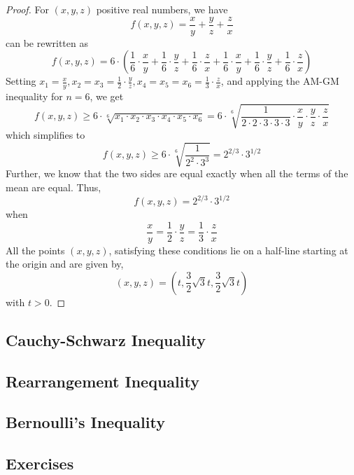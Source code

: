 \documentclass[
	12pt, %
	fleqn, %
	a4paper, %
]{LegrandOrangeBook}
\begin{document}
    \begin{proof}
    For \( (x, y, z) \) positive real numbers, we have
    \[
    f(x, y, z) = \frac{x}{y} + \frac{y}{z} + \frac{z}{x}
    \]
    can be rewritten as
    \[
    f(x, y, z) = 6 \cdot \left( \frac{1}{6} \cdot \frac{x}{y} + \frac{1}{6} \cdot \frac{y}{z} + \frac{1}{6} \cdot \frac{z}{x} + \frac{1}{6} \cdot \frac{x}{y} + \frac{1}{6} \cdot \frac{y}{z} + \frac{1}{6} \cdot \frac{z}{x} \right)
    \]
    Setting \( x_1 = \frac{x}{y}, x_2 = x_3 = \frac{1}{2} \cdot \frac{y}{z}, x_4 = x_5 = x_6 = \frac{1}{3} \cdot \frac{z}{x} \), and applying the AM-GM inequality for \( n = 6 \), we get
    \[
    f(x, y, z) \geq 6 \cdot \sqrt[6]{x_1 \cdot x_2 \cdot x_3 \cdot x_4 \cdot x_5 \cdot x_6} = 6 \cdot \sqrt[6]{\frac{1}{2 \cdot 2 \cdot 3 \cdot 3 \cdot 3} \cdot \frac{x}{y} \cdot \frac{y}{z} \cdot \frac{z}{x}}
    \]
    which simplifies to
    \[
    f(x, y, z) \geq 6 \cdot \sqrt[6]{\frac{1}{2^2 \cdot 3^3}} = 2^{2/3} \cdot 3^{1/2}
    \]
    Further, we know that the two sides are equal exactly when all the terms of the mean are equal. Thus,
    \[
    f(x, y, z) = 2^{2/3} \cdot 3^{1/2}
    \]
    when
    \[
    \frac{x}{y} = \frac{1}{2} \cdot \frac{y}{z} = \frac{1}{3} \cdot \frac{z}{x}
    \]
    All the points \( (x, y, z) \), satisfying these conditions lie on a half-line starting at the origin and are given by,
    \[
    (x, y, z) = \left( t, \frac{3}{2}\sqrt{3}t, \frac{3}{2}\sqrt{3}t \right)
    \]
    with \( t > 0 \).
    \end{proof}
    
\subsection{Cauchy-Schwarz Inequality}

\subsection{Rearrangement Inequality}

\subsection{Bernoulli's Inequality}
\subsection{Exercises}
\end{document}
